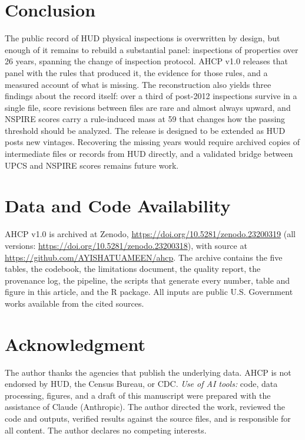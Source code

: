 \documentclass[10pt,twocolumn,letterpaper]{article}
\begin{document}
\section{Conclusion}
The public record of HUD physical inspections is overwritten by design, but enough of it remains to rebuild a substantial panel: \SInspections{} inspections of \SProperties{} properties over 26 years, spanning the change of inspection protocol. AHCP v1.0 releases that panel with the rules that produced it, the evidence for those rules, and a measured account of what is missing. The reconstruction also yields three findings about the record itself: over a third of post-2012 inspections survive in a single file, score revisions between files are rare and almost always upward, and NSPIRE scores carry a rule-induced mass at 59 that changes how the passing threshold should be analyzed. The release is designed to be extended as HUD posts new vintages. Recovering the missing years would require archived copies of intermediate files or records from HUD directly, and a validated bridge between UPCS and NSPIRE scores remains future work.

\section*{Data and Code Availability}
AHCP v1.0 is archived at Zenodo, \url{https://doi.org/10.5281/zenodo.23200319} (all versions: \url{https://doi.org/10.5281/zenodo.23200318}), with source at \url{https://github.com/AYISHATUAMEEN/ahcp}. The archive contains the five tables, the codebook, the limitations document, the quality report, the provenance log, the pipeline, the scripts that generate every number, table and figure in this article, and the R package. All inputs are public U.S. Government works available from the cited sources.

\section*{Acknowledgment}
The author thanks the agencies that publish the underlying data. AHCP is not endorsed by HUD, the Census Bureau, or CDC. \emph{Use of AI tools:} code, data processing, figures, and a draft of this manuscript were prepared with the assistance of Claude (Anthropic). The author directed the work, reviewed the code and outputs, verified results against the source files, and is responsible for all content. The author declares no competing interests.
\end{document}
